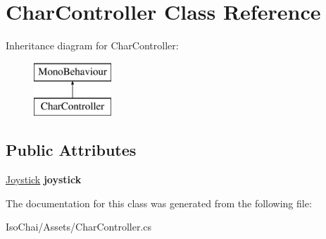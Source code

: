 \hypertarget{class_char_controller}{}\section{Char\+Controller Class Reference}
\label{class_char_controller}
Inheritance diagram for Char\+Controller\+:\begin{figure}[H]
\begin{center}
\leavevmode
\includegraphics[height=2.000000cm]{class_char_controller}
\end{center}
\end{figure}
\subsection*{Public Attributes}
\begin{DoxyCompactItemize}
\item 
\mbox{\label{class_char_controller_a61830f88f881dd25a5d4e399c08b3207}} 
\mbox{\hyperlink{class_joystick}{Joystick}} {\bfseries joystick}
\end{DoxyCompactItemize}


The documentation for this class was generated from the following file\+:\begin{DoxyCompactItemize}
\item 
Iso\+Chai/\+Assets/Char\+Controller.\+cs\end{DoxyCompactItemize}
